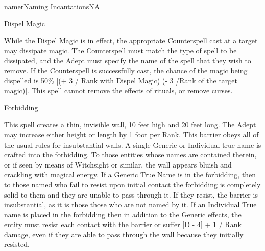 \begin{college}[2.0]{namer}{Naming Incantations}{NA}
\begin{spell}[S-5]{Dispel Magic}

\begin{effects}
While the Dispel Magic is in effect, the appropriate Counterspell cast
at a target may dissipate magic. The Counterspell must match the type
of spell to be dissipated, and the Adept must specify the name of the
spell that they wish to remove. If the Counterspell is successfully
cast, the chance of the magic being dispelled is 50\% [(+ 3 / Rank
with Dispel Magic) (- 3 /Rank of the target magic)].  This spell
cannot remove the effects of rituals, or remove curses.
\end{effects}
\end{spell}

\begin{spell}[S-6]{Forbidding}
\begin{effects}
This spell creates a thin, invisible wall, 10 feet high and 20 feet
long. The Adept may increase either height or length by 1 foot per
Rank. This barrier obeys all of the usual rules for insubstantial
walls. A single Generic or Individual true name is crafted into the
forbidding. To those entities whose names are contained therein, or if
seen by means of Witchsight or similar, the wall appears bluish and
crackling with magical energy. If a Generic True Name is in the
forbidding, then to those named who fail to resist upon initial
contact the forbidding is completely solid to them and they are unable
to pass through it. If they resist, the barrier is insubstantial, as
it is those those who are not named by it. If an Individual True name
is placed in the forbidding then in addition to the Generic effects,
the entity must resist each contact with the barrier or suffer [D - 4] +
1 / Rank damage, even if they are able to pass through the wall
because they initially resisted.
\end{effects}
\end{spell}


\end{college}
